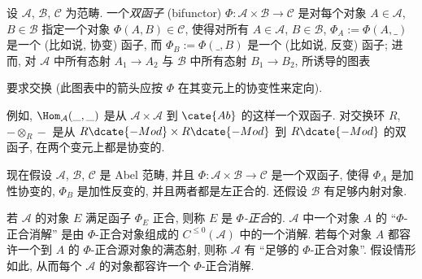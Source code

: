 \begin{prob}\label{ex:8.14}
设 $\mathcal{A}$, $\mathcal{B}$, $\mathcal{C}$ 为范畴. 一个\emph{双函子} (bifunctor) $\Phi:\mathcal{A}\times\mathcal{B}\to\mathcal{C}$ 是对每个对象 $A\in\mathcal{A}$, $B\in\mathcal{B}$ 指定一个对象 $\Phi(A,B)\in\mathcal{C}$, 使得对所有 $A\in\mathcal{A}$, $B\in\mathcal{B}$, $\Phi_A:=\Phi(A,\_)$ 是一个 (比如说, 协变) 函子, 而 $\Phi_B:=\Phi(\_,B)$ 是一个 (比如说, 反变) 函子; 进而, 对 $\mathcal{A}$ 中所有态射 $A_1\to A_2$ 与 $\mathcal{B}$ 中所有态射 $B_1\to B_2$, 所诱导的图表
\begin{center}
\end{center}
要求交换 (此图表中的箭头应按 $\Phi$ 在其变元上的协变性来定向).

例如, $\Hom_{\mathcal{A}}(\_, \_)$ 是从 $\mathcal{A}\times\mathcal{A}$ 到 $\cate{Ab}$ 的这样一个双函子. 对交换环 $R$, $-\otimes_R-$ 是从 $R\dcate{-Mod}\times R\dcate{-Mod}$ 到 $R\dcate{-Mod}$ 的双函子, 在两个变元上都是协变的.

现在假设 $\mathcal{A}$, $\mathcal{B}$, $\mathcal{C}$ 是 Abel 范畴, 并且 $\Phi:\mathcal{A}\times\mathcal{B}\to\mathcal{C}$ 是一个双函子, 使得 $\Phi_A$ 是加性协变的, $\Phi_B$ 是加性反变的, 并且两者都是左正合的. 还假设 $\mathcal{B}$ 有足够内射对象.

若 $\mathcal{A}$ 的对象 $E$ 满足函子 $\Phi_E$ 正合, 则称 $E$ 是 \emph{$\Phi$-正合}的. $\mathcal{A}$ 中一个对象 $A$ 的 ``$\Phi$-正合消解'' 是由 $\Phi$-正合对象组成的 $C^{\le 0}(\mathcal{A})$ 中的一个消解. 若每个对象 $A$ 都容许一个到 $A$ 的 $\Phi$-正合源对象的满态射, 则称 $\mathcal{A}$ 有 ``足够的 $\Phi$-正合对象''. 假设情形如此, 从而每个 $\mathcal{A}$ 的对象都容许一个 $\Phi$-正合消解.


\end{prob}
